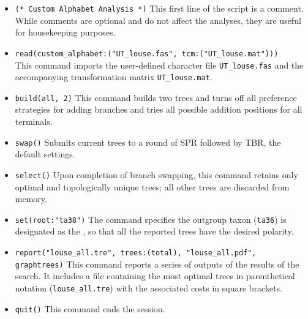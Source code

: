 \begin{itemize}
\item \texttt{(* Custom Alphabet Analysis  *)} This first line of the script is a comment. While comments 
are optional and do not affect the analyses, they are useful for housekeeping purposes.
\item \texttt{read(custom\_alphabet:("UT\_louse.fas", tcm:("UT\_louse.mat")))} \\ This command imports the 
user-defined  character file \texttt{UT\_louse.fas} and the accompanying 
transformation matrix \texttt{UT\_louse.mat}.
\item \texttt{build(all, 2)} This command builds two trees and turns off all preference strategies for adding branches 
and tries all possible addition positions for all terminals.
\item \texttt{swap()} Submits current trees to a round of SPR followed by TBR, the default settings.
\item \texttt{select()} Upon completion of branch swapping, this command retains only optimal and 
topologically unique trees; all other trees are discarded from memory.
\item \texttt{set(root:"ta38")} The  command specifies the outgroup taxon (\texttt{ta36}) 
is designated as the , so that all the reported trees have the desired polarity.
\item \texttt{report("louse\_all.tre", trees:(total), "louse\_all.pdf", \\ graphtrees)} This command reports a series of outputs
of the results of the search.  It includes a file containing the most optimal trees in parenthetical notation (\texttt{louse\_all.tre}) 
with the associated costs in square brackets.  
\item \texttt{quit()} This command ends the \poy session.
\end{itemize}




